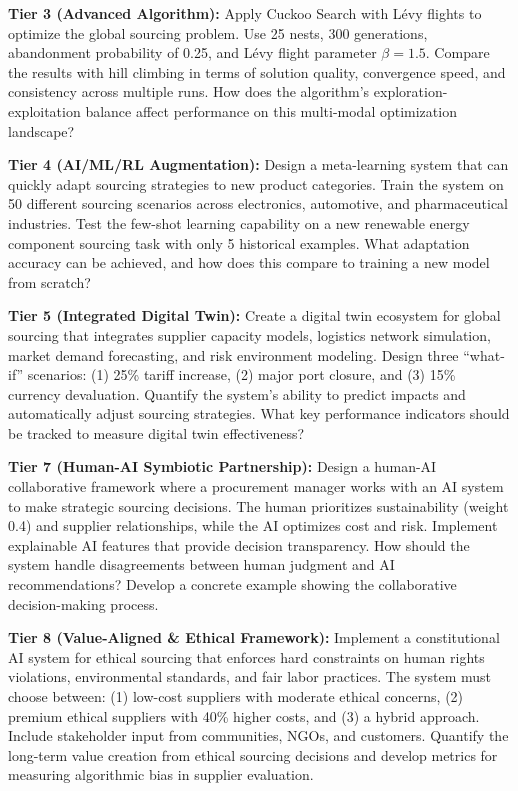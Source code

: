 \documentclass{article}
\begin{document}
\textbf{Tier 3 (Advanced Algorithm):}
Apply Cuckoo Search with Lévy flights to optimize the global sourcing problem. Use 25 nests, 300 generations, abandonment probability of 0.25, and Lévy flight parameter $\beta = 1.5$. Compare the results with hill climbing in terms of solution quality, convergence speed, and consistency across multiple runs. How does the algorithm's exploration-exploitation balance affect performance on this multi-modal optimization landscape?

\textbf{Tier 4 (AI/ML/RL Augmentation):}
Design a meta-learning system that can quickly adapt sourcing strategies to new product categories. Train the system on 50 different sourcing scenarios across electronics, automotive, and pharmaceutical industries. Test the few-shot learning capability on a new renewable energy component sourcing task with only 5 historical examples. What adaptation accuracy can be achieved, and how does this compare to training a new model from scratch?

\textbf{Tier 5 (Integrated Digital Twin):}
Create a digital twin ecosystem for global sourcing that integrates supplier capacity models, logistics network simulation, market demand forecasting, and risk environment modeling. Design three ``what-if'' scenarios: (1) 25\% tariff increase, (2) major port closure, and (3) 15\% currency devaluation. Quantify the system's ability to predict impacts and automatically adjust sourcing strategies. What key performance indicators should be tracked to measure digital twin effectiveness?

\textbf{Tier 7 (Human-AI Symbiotic Partnership):}
Design a human-AI collaborative framework where a procurement manager works with an AI system to make strategic sourcing decisions. The human prioritizes sustainability (weight 0.4) and supplier relationships, while the AI optimizes cost and risk. Implement explainable AI features that provide decision transparency. How should the system handle disagreements between human judgment and AI recommendations? Develop a concrete example showing the collaborative decision-making process.

\textbf{Tier 8 (Value-Aligned \& Ethical Framework):}
Implement a constitutional AI system for ethical sourcing that enforces hard constraints on human rights violations, environmental standards, and fair labor practices. The system must choose between: (1) low-cost suppliers with moderate ethical concerns, (2) premium ethical suppliers with 40\% higher costs, and (3) a hybrid approach. Include stakeholder input from communities, NGOs, and customers. Quantify the long-term value creation from ethical sourcing decisions and develop metrics for measuring algorithmic bias in supplier evaluation.
\end{document}
